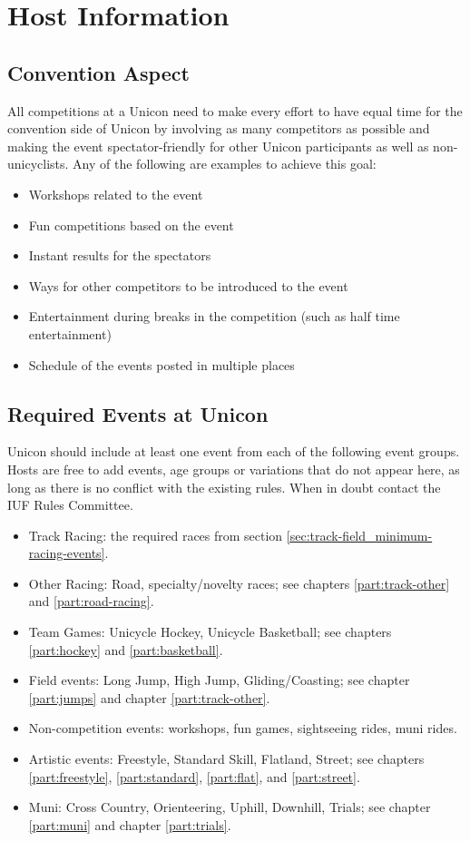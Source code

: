 \chapter{Host Information}

\section{Convention Aspect}

All competitions at a Unicon need to make every effort to have equal time for the convention side of Unicon by involving as many competitors as possible and making the event spectator-friendly for other Unicon participants as well as non-unicyclists.
Any of the following are examples to achieve this goal:
\begin{itemize}
  \item Workshops related to the event
  \item Fun competitions based on the event
  \item Instant results for the spectators
  \item Ways for other competitors to be introduced to the event
  \item Entertainment during breaks in the competition (such as half time entertainment)
  \item Schedule of the events posted in multiple places
\end{itemize}

\section{Required Events at Unicon}%

Unicon should include at least one event from each of the following event groups.
Hosts are free to add events, age groups or variations that do not appear here, as long as there is no conflict with the existing rules.
When in doubt contact the IUF Rules Committee.
\begin{itemize}
  \item Track Racing: the required races from section \ref{sec:track-field_minimum-racing-events}.
  \item Other Racing: Road, specialty/novelty races; see chapters \ref{part:track-other} and \ref{part:road-racing}.
  \item Team Games: Unicycle Hockey, Unicycle Basketball; see chapters \ref{part:hockey} and \ref{part:basketball}.
  \item Field events: Long Jump, High Jump, Gliding/Coasting; see chapter \ref{part:jumps} and chapter \ref{part:track-other}.
  \item Non-competition events: workshops, fun games, sightseeing rides, muni rides.
  \item Artistic events: Freestyle, Standard Skill, Flatland, Street; see chapters \ref{part:freestyle}, \ref{part:standard}, \ref{part:flat}, and \ref{part:street}.
  \item Muni: Cross Country, Orienteering, Uphill, Downhill, Trials; see chapter \ref{part:muni} and chapter \ref{part:trials}.
\end{itemize}

